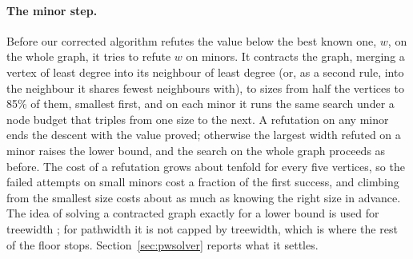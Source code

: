 \paragraph{The minor step.} Before our corrected algorithm refutes the value
below the best known one, $w$, on the whole graph, it tries to refute $w$ on
minors. It contracts the graph, merging a vertex of least degree into its
neighbour of least degree (or, as a second rule, into the neighbour it shares
fewest neighbours with), to sizes from half the vertices to 85\% of them,
smallest first, and on each minor it runs the same search under a node budget
that triples from one size to the next. A refutation on any minor ends the
descent with the value proved; otherwise the largest width refuted on a minor
raises the lower bound, and the search on the whole graph proceeds as before.
The cost of a refutation grows about tenfold for every five vertices, so the
failed attempts on small minors cost a fraction of the first success, and
climbing from the smallest size costs about as much as knowing the right size
in advance. The idea of solving a contracted graph exactly for a lower bound
is used for treewidth \citep{BodlaenderWolleKoster2006,BodlaenderKoster2011};
for pathwidth it is not capped by treewidth, which is where the rest of the
floor stops. Section~\ref{sec:pwsolver} reports what it settles.
